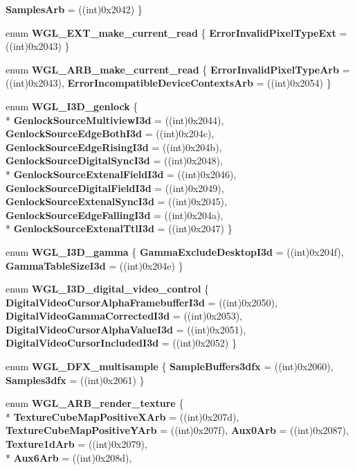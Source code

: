 \begin{DoxyCompactItemize}
{\bfseries Samples\-Arb} = ((int)0x2042)
 \}
\item 
enum {\bfseries W\-G\-L\-\_\-\-E\-X\-T\-\_\-make\-\_\-current\-\_\-read} \{ {\bfseries Error\-Invalid\-Pixel\-Type\-Ext} = ((int)0x2043)
 \}
\item 
enum {\bfseries W\-G\-L\-\_\-\-A\-R\-B\-\_\-make\-\_\-current\-\_\-read} \{ {\bfseries Error\-Invalid\-Pixel\-Type\-Arb} = ((int)0x2043), 
{\bfseries Error\-Incompatible\-Device\-Contexts\-Arb} = ((int)0x2054)
 \}
\item 
enum {\bfseries W\-G\-L\-\_\-\-I3\-D\-\_\-genlock} \{ \\*
{\bfseries Genlock\-Source\-Multiview\-I3d} = ((int)0x2044), 
{\bfseries Genlock\-Source\-Edge\-Both\-I3d} = ((int)0x204c), 
{\bfseries Genlock\-Source\-Edge\-Rising\-I3d} = ((int)0x204b), 
{\bfseries Genlock\-Source\-Digital\-Sync\-I3d} = ((int)0x2048), 
\\*
{\bfseries Genlock\-Source\-Extenal\-Field\-I3d} = ((int)0x2046), 
{\bfseries Genlock\-Source\-Digital\-Field\-I3d} = ((int)0x2049), 
{\bfseries Genlock\-Source\-Extenal\-Sync\-I3d} = ((int)0x2045), 
{\bfseries Genlock\-Source\-Edge\-Falling\-I3d} = ((int)0x204a), 
\\*
{\bfseries Genlock\-Source\-Extenal\-Ttl\-I3d} = ((int)0x2047)
 \}
\item 
enum {\bfseries W\-G\-L\-\_\-\-I3\-D\-\_\-gamma} \{ {\bfseries Gamma\-Exclude\-Desktop\-I3d} = ((int)0x204f), 
{\bfseries Gamma\-Table\-Size\-I3d} = ((int)0x204e)
 \}
\item 
enum {\bfseries W\-G\-L\-\_\-\-I3\-D\-\_\-digital\-\_\-video\-\_\-control} \{ {\bfseries Digital\-Video\-Cursor\-Alpha\-Framebuffer\-I3d} = ((int)0x2050), 
{\bfseries Digital\-Video\-Gamma\-Corrected\-I3d} = ((int)0x2053), 
{\bfseries Digital\-Video\-Cursor\-Alpha\-Value\-I3d} = ((int)0x2051), 
{\bfseries Digital\-Video\-Cursor\-Included\-I3d} = ((int)0x2052)
 \}
\item 
enum {\bfseries W\-G\-L\-\_\-D\-F\-X\-\_\-multisample} \{ {\bfseries Sample\-Buffers3dfx} = ((int)0x2060), 
{\bfseries Samples3dfx} = ((int)0x2061)
 \}
\item 
enum {\bfseries W\-G\-L\-\_\-\-A\-R\-B\-\_\-render\-\_\-texture} \{ \\*
{\bfseries Texture\-Cube\-Map\-Positive\-X\-Arb} = ((int)0x207d), 
{\bfseries Texture\-Cube\-Map\-Positive\-Y\-Arb} = ((int)0x207f), 
{\bfseries Aux0\-Arb} = ((int)0x2087), 
{\bfseries Texture1d\-Arb} = ((int)0x2079), 
\\*
{\bfseries Aux6\-Arb} = ((int)0x208d), 

\end{DoxyCompactItemize}
